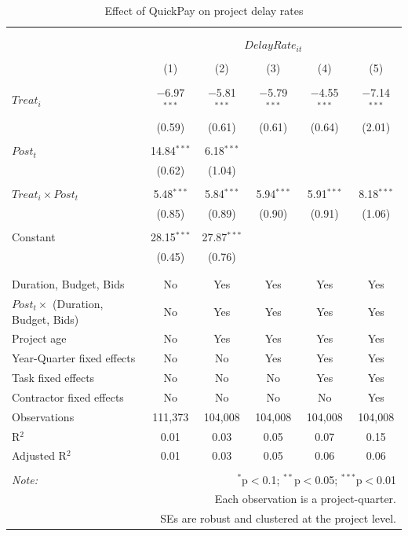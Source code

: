 \documentclass[
]{article}
\begin{document}
\begin{table}[H] \centering 
  \caption{Effect of QuickPay on project delay rates} 
  \label{} 
\small 
\begin{tabular}{@{\extracolsep{-2pt}}lccccc} 
\\[-1.8ex]\hline 
\hline \\[-1.8ex] 
\\[-1.8ex] & \multicolumn{5}{c}{$DelayRate_{it}$} \\ 
\\[-1.8ex] & (1) & (2) & (3) & (4) & (5)\\ 
\hline \\[-1.8ex] 
 $Treat_i$ & $-$6.97$^{***}$ & $-$5.81$^{***}$ & $-$5.79$^{***}$ & $-$4.55$^{***}$ & $-$7.14$^{***}$ \\ 
  & (0.59) & (0.61) & (0.61) & (0.64) & (2.01) \\ 
  & & & & & \\ 
 $Post_t$ & 14.84$^{***}$ & 6.18$^{***}$ &  &  &  \\ 
  & (0.62) & (1.04) &  &  &  \\ 
  & & & & & \\ 
 $Treat_i \times Post_t$ & 5.48$^{***}$ & 5.84$^{***}$ & 5.94$^{***}$ & 5.91$^{***}$ & 8.18$^{***}$ \\ 
  & (0.85) & (0.89) & (0.90) & (0.91) & (1.06) \\ 
  & & & & & \\ 
 Constant & 28.15$^{***}$ & 27.87$^{***}$ &  &  &  \\ 
  & (0.45) & (0.76) &  &  &  \\ 
  & & & & & \\ 
\hline \\[-1.8ex] 
Duration, Budget, Bids & No & Yes & Yes & Yes & Yes \\ 
$Post_t \times$  (Duration, Budget, Bids) & No & Yes & Yes & Yes & Yes \\ 
Project age & No & Yes & Yes & Yes & Yes \\ 
Year-Quarter fixed effects & No & No & Yes & Yes & Yes \\ 
Task fixed effects & No & No & No & Yes & Yes \\ 
Contractor fixed effects & No & No & No & No & Yes \\ 
Observations & 111,373 & 104,008 & 104,008 & 104,008 & 104,008 \\ 
R$^{2}$ & 0.01 & 0.03 & 0.05 & 0.07 & 0.15 \\ 
Adjusted R$^{2}$ & 0.01 & 0.03 & 0.05 & 0.06 & 0.06 \\ 
\hline 
\hline \\[-1.8ex] 
\textit{Note:}  & \multicolumn{5}{r}{$^{*}$p$<$0.1; $^{**}$p$<$0.05; $^{***}$p$<$0.01} \\ 
 & \multicolumn{5}{r}{Each observation is a project-quarter.} \\ 
 & \multicolumn{5}{r}{SEs are robust and clustered at the project level.} \\ 
\end{tabular} 
\end{table}
\end{document}
